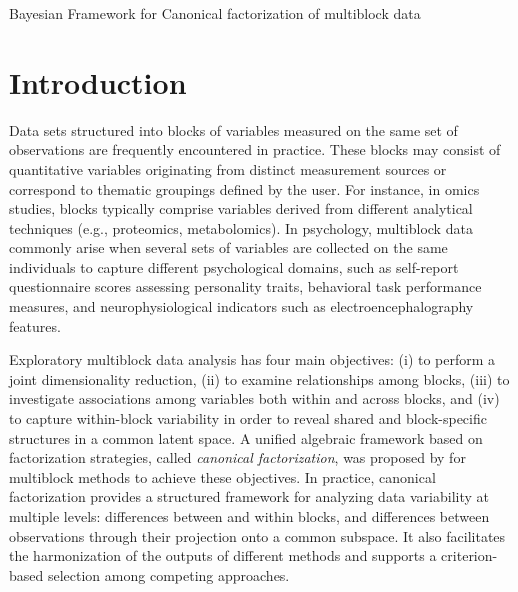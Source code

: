 \documentclass[11pt]{article}
\begin{document}
\renewcommand{\headrulewidth}{0pt}



\begin{center}
{\Large
	{\sc Bayesian Framework for Canonical factorization of multiblock data}
}
\bigskip

\bigskip

\end{center}
\bigskip

\section{Introduction}

Data sets structured into blocks of variables measured on the same set of observations are frequently encountered in practice. These blocks may consist of quantitative variables originating from distinct measurement sources or correspond to thematic groupings defined by the user. For instance, in omics studies, blocks typically comprise variables derived from different analytical techniques (e.g., proteomics, metabolomics). In psychology, multiblock data commonly arise when several sets of variables are collected on the same individuals to capture different psychological domains, such as
self-report questionnaire scores assessing personality traits, behavioral task performance measures, and neurophysiological indicators such as electroencephalography features.

Exploratory multiblock data analysis has four main objectives: (i) to perform a joint dimensionality reduction, (ii) to examine relationships among blocks, (iii) to investigate associations among variables both within and across blocks, and (iv) to capture within-block variability in order to reveal shared and block-specific structures in a common latent space.
A unified algebraic framework based on factorization strategies, called \textit{canonical factorization}, was proposed by \cite{bougeard2024} for multiblock methods to achieve these objectives. In practice, canonical factorization provides a structured framework for analyzing data variability at multiple levels: differences between and within blocks, and
differences between observations through their projection onto a common subspace. It also facilitates the harmonization of the outputs of different methods and supports a criterion-based selection among competing approaches.
\end{document}
